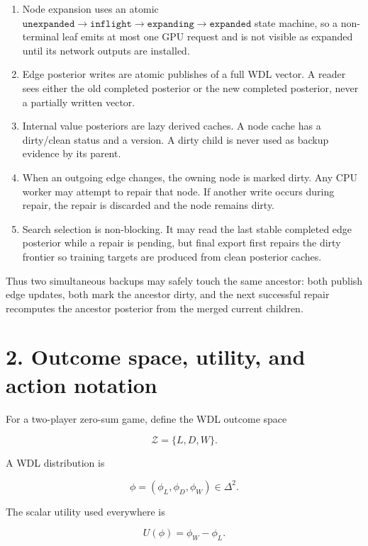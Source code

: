 \documentclass[11pt]{article}
\newcommand{\Z}{\mathcal{Z}}
\newcommand{\Utility}{U}
\begin{document}
\begin{enumerate}[leftmargin=2em]
  \item Node expansion uses an atomic
  \(\texttt{unexpanded}\rightarrow\texttt{inflight}\rightarrow
  \texttt{expanding}\rightarrow\texttt{expanded}\) state machine, so a
  non-terminal leaf emits at most one GPU request and is not visible as expanded
  until its network outputs are installed.

  \item Edge posterior writes are atomic publishes of a full WDL vector. A
  reader sees either the old completed posterior or the new completed posterior,
  never a partially written vector.

  \item Internal value posteriors are lazy derived caches. A node cache has a
  dirty/clean status and a version. A dirty child is never used as backup
  evidence by its parent.

  \item When an outgoing edge changes, the owning node is marked dirty. Any CPU
  worker may attempt to repair that node. If another write occurs during repair,
  the repair is discarded and the node remains dirty.

  \item Search selection is non-blocking. It may read the last stable completed
  edge posterior while a repair is pending, but final export first repairs the
  dirty frontier so training targets are produced from clean posterior caches.
\end{enumerate}

Thus two simultaneous backups may safely touch the same ancestor: both publish
edge updates, both mark the ancestor dirty, and the next successful repair
recomputes the ancestor posterior from the merged current children.

\section*{2. Outcome space, utility, and action notation}

For a two-player zero-sum game, define the WDL outcome space

\[
\Z = \{L,D,W\}.
\]

A WDL distribution is

\[
\phi = (\phi_L,\phi_D,\phi_W) \in \Delta^2.
\]

The scalar utility used everywhere is

\[
\Utility(\phi) = \phi_W - \phi_L.
\]
\end{document}
